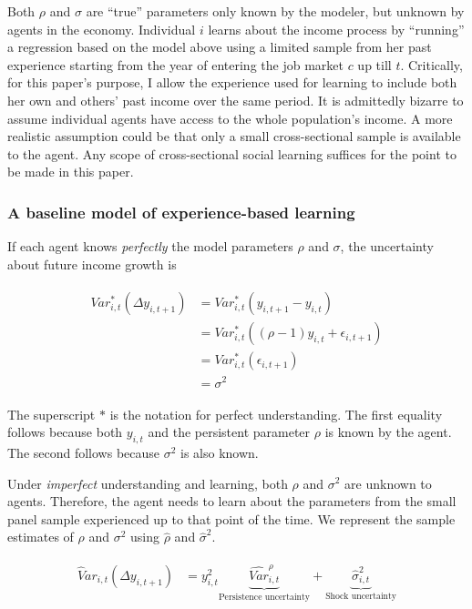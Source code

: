 \documentclass[12pt,notitlepage,onecolumn,aps,pra]{article}
\begin{document}
Both \(\rho\) and \(\sigma\) are ``true'' parameters only known by the
modeler, but unknown by agents in the economy. Individual \(i\) learns
about the income process by ``running'' a regression based on the model
above using a limited sample from her past experience starting from the
year of entering the job market \(c\) up till \(t\). Critically, for
this paper's purpose, I allow the experience used for learning to
include both her own and others' past income over the same period. It is
admittedly bizarre to assume individual agents have access to the whole
population's income. A more realistic assumption could be that only a
small cross-sectional sample is available to the agent. Any scope of
cross-sectional social learning suffices for the point to be made in
this paper.

    \hypertarget{a-baseline-model-of-experience-based-learning}{%
\subsubsection{A baseline model of experience-based
learning}\label{a-baseline-model-of-experience-based-learning}}

If each agent knows \emph{perfectly} the model parameters \(\rho\) and
\(\sigma\), the uncertainty about future income growth is

\begin{eqnarray}
\begin{split}
Var^*_{i,t}(\Delta y_{i,t+1}) & =  Var^*_{i,t}(y_{i,t+1}- y_{i,t}) \\ 
& =  Var^*_{i,t}((\rho-1)y_{i,t} + \epsilon_{i,t+1}) \\
& = Var^*_{i,t}(\epsilon_{i,t+1}) \\
& = \sigma^2
\end{split}
\end{eqnarray}

The superscript \(*\) is the notation for perfect understanding. The
first equality follows because both \(y_{i,t}\) and the persistent
parameter \(\rho\) is known by the agent. The second follows because
\(\sigma^2\) is also known.

Under \emph{imperfect} understanding and learning, both \(\rho\) and
\(\sigma^2\) are unknown to agents. Therefore, the agent needs to learn
about the parameters from the small panel sample experienced up to that
point of the time. We represent the sample estimates of \(\rho\) and
\(\sigma^2\) using \(\widehat \rho\) and \(\hat{\sigma}^2\).

\begin{eqnarray}
\begin{split}
\widehat Var_{i,t}(\Delta y_{i,t+1}) & = y_{i,t}^2 \underbrace{\widehat{Var}^{\rho}_{i,t}}_{\text{Persistence uncertainty}} + \underbrace{\hat{\sigma}^2_{i,t}}_{\text{Shock uncertainty}}
\end{split}
\end{eqnarray}
\end{document}
